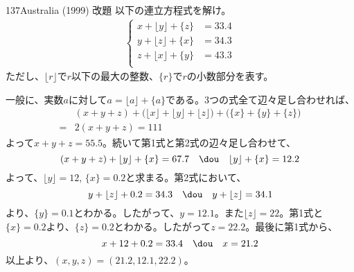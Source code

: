 \begin{thm}{137}{\maru}{Australia (1999) 改題}
 以下の連立方程式を解け。
 \begin{align*}
  \left\{
  \begin{aligned}
   x+\lfloor y \rfloor + \{z\} &= 33.4 \\
   y+\lfloor z \rfloor + \{x\} &= 34.3 \\
   z+\lfloor x \rfloor + \{y\} &= 43.3 \\
  \end{aligned}
  \right.
 \end{align*}
 ただし、$\lfloor r \rfloor$で$r$以下の最大の整数、$\{r\}$で$r$の小数部分を表す。
\end{thm}

一般に、実数$a$に対して$a=\lfloor a \rfloor+ \{a\}$である。3つの式全て辺々足し合わせれば、
\begin{align*}
 &(x+y+z)+\bigl(\lfloor x\rfloor+\lfloor y\rfloor +\lfloor z\rfloor\bigr) + \bigl(\{x\}+\{y\}+\{z\}\bigr) \\
 =&2(x+y+z)= 111
\end{align*}
よって$x+y+z=55.5$。続いて第1式と第2式の辺々足し合わせて、
\[ (x+y+z)+\lfloor y\rfloor+\{x\}=67.7 \quad\dou\quad \lfloor y\rfloor+\{x\}=12.2 \]
よって、$\lfloor y\rfloor=12$, $\{x\}=0.2$と求まる。第2式において、
\[ y+\lfloor z\rfloor + 0.2=34.3 \quad\dou\quad y+\lfloor z\rfloor =34.1 \]
より、$\{y\}=0.1$とわかる。したがって、$y=12.1$。また$\lfloor z\rfloor=22$。第1式と$\{x\}=0.2$より、$\{z\}=0.2$とわかる。したがって$z=22.2$。最後に第1式から、
\[ x+12+0.2=33.4 \quad\dou\quad x=21.2 \]
以上より、$(x, y, z)=(21.2, 12.1, 22.2)$。